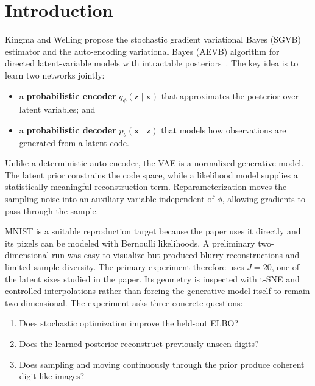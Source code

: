 \documentclass[11pt]{article}
\begin{document}
\vfill
\begin{center}
\end{center}

\newpage
\tableofcontents
\newpage

\section{Introduction}

Kingma and Welling propose the stochastic gradient variational Bayes (SGVB) estimator and the auto-encoding variational Bayes (AEVB) algorithm for directed latent-variable models with intractable posteriors~\cite{kingma2013}. The key idea is to learn two networks jointly:

\begin{itemize}
  \item a \textbf{probabilistic encoder} $q_\phi(\bm{z}\mid\bm{x})$ that approximates the posterior over latent variables; and
  \item a \textbf{probabilistic decoder} $p_\theta(\bm{x}\mid\bm{z})$ that models how observations are generated from a latent code.
\end{itemize}

Unlike a deterministic auto-encoder, the VAE is a normalized generative model. The latent prior constrains the code space, while a likelihood model supplies a statistically meaningful reconstruction term. Reparameterization moves the sampling noise into an auxiliary variable independent of $\phi$, allowing gradients to pass through the sample.

MNIST is a suitable reproduction target because the paper uses it directly and its pixels can be modeled with Bernoulli likelihoods. A preliminary two-dimensional run was easy to visualize but produced blurry reconstructions and limited sample diversity. The primary experiment therefore uses $J=20$, one of the latent sizes studied in the paper. Its geometry is inspected with t-SNE and controlled interpolations rather than forcing the generative model itself to remain two-dimensional. The experiment asks three concrete questions:

\begin{enumerate}
  \item Does stochastic optimization improve the held-out ELBO?
  \item Does the learned posterior reconstruct previously unseen digits?
  \item Does sampling and moving continuously through the prior produce coherent digit-like images?
\end{enumerate}
\end{document}
